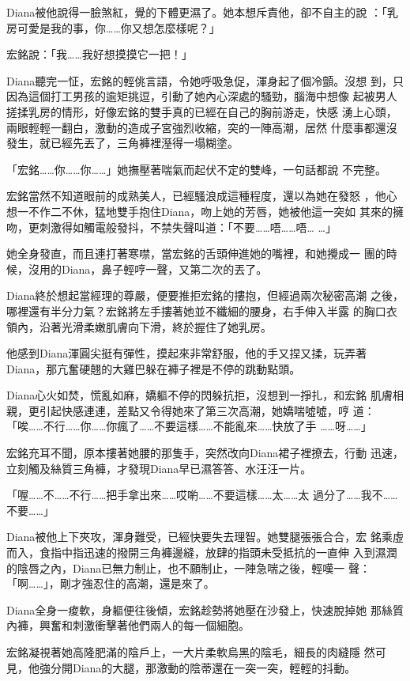 Diana被他說得一臉煞紅，覺的下體更濕了。她本想斥責他，卻不自主的說
：「乳房可愛是我的事，你……你又想怎麼樣呢？」

宏銘說：「我……我好想摸摸它一把！」

Diana聽完一怔，宏銘的輕佻言語，令她呼吸急促，渾身起了個冷顫。沒想
到，只因為這個打工男孩的逾矩挑逗，引動了她內心深處的騷勁，腦海中想像
起被男人搓揉乳房的情形，好像宏銘的雙手真的已經在自己的胸前游走，快感
湧上心頭，兩眼輕輕一翻白，激動的造成子宮強烈收縮，突的一陣高潮，居然
什麼事都還沒發生，就已經先丟了，三角褲裡溼得一塌糊塗。

「宏銘……你……你……」她撫壓著喘氣而起伏不定的雙峰，一句話都說
不完整。

宏銘當然不知道眼前的成熟美人，已經騷浪成這種程度，還以為她在發怒
，他心想一不作二不休，猛地雙手抱住Diana，吻上她的芳唇，她被他這一突如
其來的擁吻，更刺激得如觸電般發抖，不禁失聲叫道：「不要……唔……唔…
…」

她全身發直，而且連打著寒噤，當宏銘的舌頭伸進她的嘴裡，和她攪成一
團的時候，沒用的Diana，鼻子輕哼一聲，又第二次的丟了。

Diana終於想起當經理的尊嚴，便要推拒宏銘的摟抱，但經過兩次秘密高潮
之後，哪裡還有半分力氣？宏銘將左手摟著她並不纖細的腰身，右手伸入半露
的胸口衣領內，沿著光滑柔嫩肌膚向下滑，終於握住了她乳房。

他感到Diana渾圓尖挺有彈性，摸起來非常舒服，他的手又捏又揉，玩弄著
Diana，那亢奮硬翹的大雞巴躲在褲子裡是不停的跳動點頭。

Diana心火如焚，慌亂如麻，嬌軀不停的閃躲抗拒，沒想到一掙扎，和宏銘
肌膚相親，更引起快感連連，差點又令得她來了第三次高潮，她嬌喘噓噓，哼
道：「唉……不行……你……你瘋了……不要這樣……不能亂來……快放了手
……呀……」

宏銘充耳不聞，原本摟著她腰的那隻手，突然改向Diana裙子裡撩去，行動
迅速，立刻觸及絲質三角褲，才發現Diana早已濕答答、水汪汪一片。

「喔……不……不行……把手拿出來……哎喲……不要這樣……太……太
過分了……我不……不要……」

Diana被他上下夾攻，渾身難受，已經快要失去理智。她雙腿張張合合，宏
銘乘虛而入，食指中指迅速的撥開三角褲邊縫，放肆的指頭未受抵抗的一直伸
入到濕潤的陰唇之內，Diana已無力制止，也不願制止，一陣急喘之後，輕嘆一
聲：「啊……」，剛才強忍住的高潮，還是來了。

Diana全身一痠軟，身軀便往後傾，宏銘趁勢將她壓在沙發上，快速脫掉她
那絲質內褲，興奮和刺激衝擊著他們兩人的每一個細胞。

宏銘凝視著她高隆肥滿的陰戶上，一大片柔軟烏黑的陰毛，細長的肉縫隱
然可見，他強分開Diana的大腿，那激動的陰蒂還在一突一突，輕輕的抖動。

